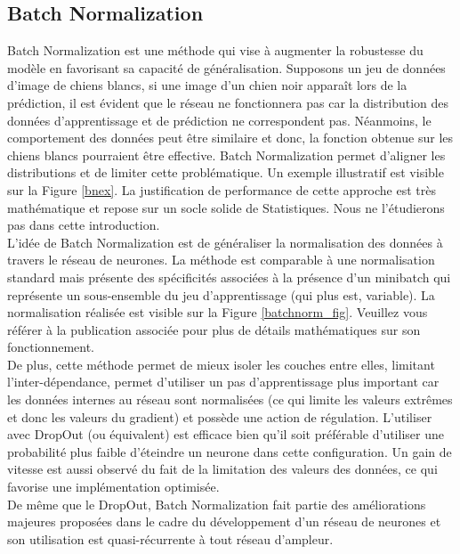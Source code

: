 \subsection{Batch Normalization}

Batch Normalization\cite{batchnorm_deep} est une méthode qui vise à augmenter la robustesse du modèle en favorisant sa capacité de généralisation. Supposons un jeu de données d'image de chiens blancs, si une image d'un chien noir apparaît lors de la prédiction, il est évident que le réseau ne fonctionnera pas car la distribution des données d'apprentissage et de prédiction ne correspondent pas. Néanmoins, le comportement des données peut être similaire et donc, la fonction obtenue sur les chiens blancs pourraient être effective. Batch Normalization permet d'aligner les distributions et de limiter cette problématique. Un exemple illustratif est visible sur la Figure \ref{bnex}. La justification de performance de cette approche est très mathématique et repose sur un socle solide de Statistiques. Nous ne l'étudierons pas dans cette introduction.\\

\noindent L'idée de Batch Normalization est de généraliser la normalisation des données à travers le réseau de neurones. La méthode est comparable à une normalisation standard mais présente des spécificités associées à la présence d'un minibatch qui représente un sous-ensemble du jeu d'apprentissage (qui plus est, variable). La normalisation réalisée est visible sur la Figure \ref{batchnorm_fig}. Veuillez vous référer à la publication associée\cite{batchnorm_deep} pour plus de détails mathématiques sur son fonctionnement.  \\

\noindent De plus, cette méthode permet de mieux isoler les couches entre elles, limitant l'inter-dépendance, permet d'utiliser un pas d'apprentissage plus important car les données internes au réseau sont normalisées (ce qui limite les valeurs extrêmes et donc les valeurs du gradient) et possède une action de régulation. L'utiliser avec DropOut (ou équivalent) est efficace bien qu'il soit préférable d'utiliser une probabilité plus faible d'éteindre un neurone dans cette configuration. Un gain de vitesse est aussi observé du fait de la limitation des valeurs des données, ce qui favorise une implémentation optimisée.\\

\noindent De même que le DropOut, Batch Normalization fait partie des améliorations majeures proposées dans le cadre du développement d'un réseau de neurones et son utilisation est quasi-récurrente à tout réseau d'ampleur.

